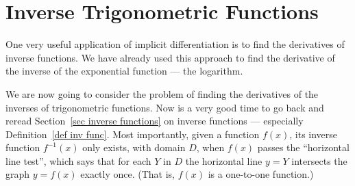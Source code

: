 \begin{comment}
It is also an easy matter to use implicit differentiation to find
a formula for the derivative\footnote{There is a theorem called the
Inverse Function Theorem, which we will not prove, that says that,
under reasonable hypotheses on $f(x)$,
$f^{-1}(x)$ is differentiable.} of $f^{-1}$ in terms of the derivative of
$f$. Substitute $Y=f^{-1}(X)$ into $f(Y)=X$ to give
\begin{equation*}
f\big(f^{-1}(X)\big)=X
\end{equation*}
Rename $X$ to $x$ and apply $\diff{}{x}$ to both sides.
\begin{equation*}
\diff{}{x}f\big(f^{-1}(x)\big)=\diff{}{x}x=1
\end{equation*}
By the chain rule
\begin{equation}\label{eq:DIFFinvderiv}
f'\big(f^{-1}(x)\big)\cdot \diff{}{x} f^{-1}(x)=1
\implies  \diff{}{x} f^{-1}(x) = \frac{1}{f'\big(f^{-1}(x)\big)}
\end{equation}

\begin{eg}\label{eg:DIFFlnderiv}
The inverse function of $f(x)=e^x$ is $f^{-1}(x)=\ln x$. Since $f'(x)=e^x$,
\eqref{eq:DIFFinvderiv} gives
\begin{equation*}
\diff{}{x} \ln x = \frac{1}{e^{\ln x}}=\frac{1}{x}
\end{equation*}
This is of course the same answer for $\diff{}{x} \ln x$ as we saw in
\eqref{eq:DIFFdln}. (In fact \eqref{eq:DIFFdln} was exactly the computation
of \eqref{eq:DIFFinvderiv} in the special case that $f(x)=e^x$.)
\end{eg}
\end{comment}


\section{Inverse Trigonometric Functions}\label{sec:invTrig}
One very useful application of implicit differentiation is to find the
derivatives of inverse functions. We have already used this approach to find
the derivative of the inverse of the exponential function --- the
logarithm.

We are now going to consider the problem of finding the derivatives of the
inverses of trigonometric functions. Now is a very good time to go back
and reread Section~\ref{sec inverse functions} on inverse functions ---
especially Definition~\ref{def inv func}. Most importantly, given a function $f(x)$, its
inverse function $f^{-1}(x)$ only exists, with domain $D$, when $f(x)$ passes the
``horizontal line test'', which says that for each $Y$ in $D$ the horizontal line $y=Y$
intersects the graph $y=f(x)$ exactly once. (That is, $f(x)$  is a one-to-one function.)

